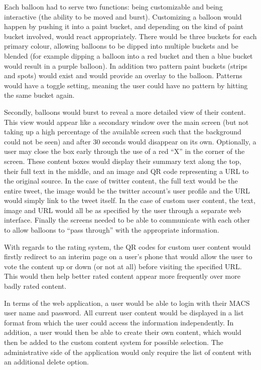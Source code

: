 \documentclass[a4paper,11pt]{article}
\begin{document}
\begin{description}
Each balloon had to serve two functions: being customizable and being interactive (the ability to be moved and burst). Customizing a balloon would happen by pushing it into a paint bucket, and depending on the kind of paint bucket involved, would react appropriately. There would be three buckets for each primary colour, allowing balloons to be dipped into multiple buckets and be blended (for example dipping a balloon into a red bucket and then a blue bucket would result in a purple balloon). In addition two pattern paint buckets (strips and spots) would exist and would provide an overlay to the balloon. Patterns would have a toggle setting, meaning the user could have no pattern by hitting the same bucket again.

Secondly, balloons would burst to reveal a more detailed view of their content. This view would appear like a secondary window over the main screen (but not taking up a high percentage of the available screen such that the background could not be seen) and after 30 seconds would disappear on its own. Optionally, a user may close the box early through the use of a red ``X'' in the corner of the screen. These content boxes would display their summary text along the top, their full text in the middle, and an image and QR code representing a URL to the original source. In the case of twitter content, the full text would be the entire tweet, the image would be the twitter account's user profile and the URL would simply link to the tweet itself. In the case of custom user content, the text, image and URL would all be as specified by the user through a separate web interface. Finally the screens needed to be able to communicate with each other to allow balloons to ``pass through'' with the appropriate information.

With regards to the rating system, the QR codes for custom user content would firstly redirect to an interim page on a user's phone that would allow the user to vote the content up or down (or not at all) before visiting the specified URL. This would then help better rated content appear more frequently over more badly rated content.

In terms of the web application, a user would be able to login with their MACS user name and password. All current user content would be displayed in a list format from which the user could access the information independently. In addition, a user would then be able to create their own content, which would then be added to the custom content system for possible selection. The administrative side of the application would only require the list of content with an additional delete option.


\end{description}
\end{document}
